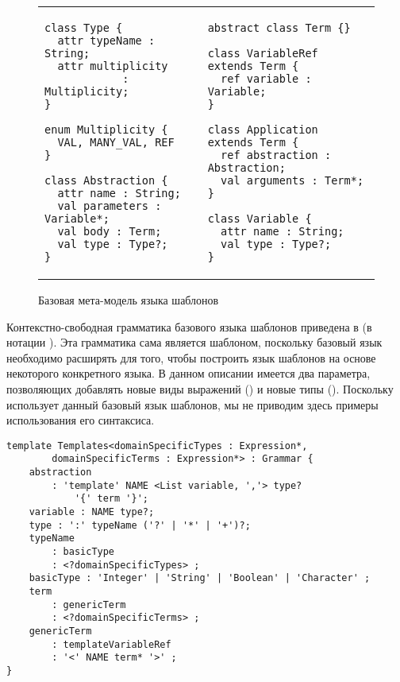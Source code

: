 {\begin{figure}[htbp]
	\centering
\begin{tabular}{p{}p{}}
\begin{lstlisting}[xleftmargin=0cm]
class Type {
  attr typeName : String;
  attr multiplicity 
  			: Multiplicity;
}

enum Multiplicity {
  VAL, MANY_VAL, REF
}

class Abstraction {
  attr name : String;
  val parameters : Variable*;
  val body : Term;
  val type : Type?;
}

\end{lstlisting}
&
\begin{lstlisting}[xleftmargin=0cm]
abstract class Term {}

class VariableRef extends Term {
  ref variable : Variable;
}

class Application extends Term {
  ref abstraction : Abstraction;
  val arguments : Term*;
}

class Variable {
  attr name : String;
  val type : Type?;
}
\end{lstlisting}
\end{tabular}
	\caption{Базовая мета-модель языка шаблонов}\label{TempMM}
\end{figure}

Контекстно-свободная грамматика базового языка шаблонов приведена в  (в нотации \GRM{}). Эта грамматика сама является шаблоном, поскольку базовый язык необходимо расширять для того, чтобы построить язык шаблонов на основе некоторого конкретного языка. В данном описании имеется два параметра, позволяющих добавлять новые виды выражений () и новые типы (). Поскольку \GRM{} использует данный базовый язык шаблонов, мы не приводим здесь примеры использования его синтаксиса.

\begin{lstlisting}[label=TempG,float=htbp,caption=Базовый синтаксис языка шаблонов]
template Templates<domainSpecificTypes : Expression*, 
		domainSpecificTerms : Expression*> : Grammar {
	abstraction 
		: 'template' NAME <List variable, ','> type? 
			'{' term '}';
	variable : NAME type?;
	type : ':' typeName ('?' | '*' | '+')?;
	typeName
		: basicType
		: <?domainSpecificTypes> ;
	basicType : 'Integer' | 'String' | 'Boolean' | 'Character' ;
	term
		: genericTerm
		: <?domainSpecificTerms> ;
	genericTerm
		: templateVariableRef
		: '<' NAME term* '>' ;
}
\end{lstlisting}

}
